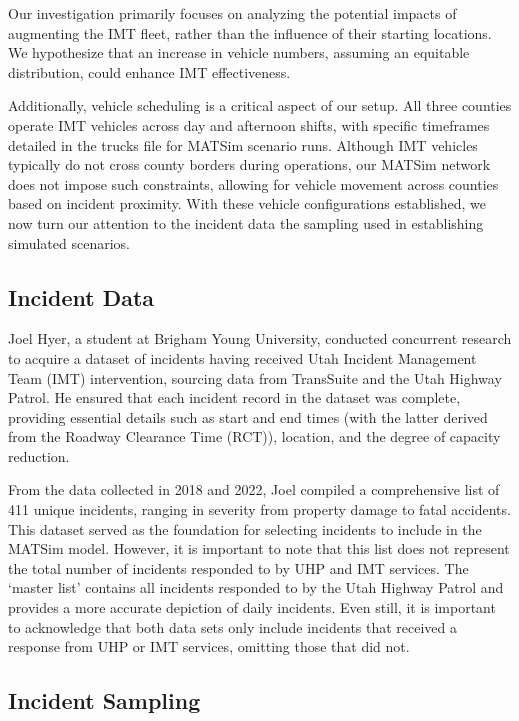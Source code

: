 \documentclass[fancy, oneside, mastersfancy, ms]{byuthesis}
\begin{document}
Our investigation primarily focuses on analyzing the potential impacts
of augmenting the IMT fleet, rather than the influence of their starting
locations. We hypothesize that an increase in vehicle numbers, assuming
an equitable distribution, could enhance IMT effectiveness.

Additionally, vehicle scheduling is a critical aspect of our setup. All
three counties operate IMT vehicles across day and afternoon shifts,
with specific timeframes detailed in the trucks file for MATSim scenario
runs. Although IMT vehicles typically do not cross county borders during
operations, our MATSim network does not impose such constraints,
allowing for vehicle movement across counties based on incident
proximity. With these vehicle configurations established, we now turn
our attention to the incident data the sampling used in establishing
simulated scenarios.

\hypertarget{incident-data}{%
\subsection{Incident Data}\label{incident-data}}

Joel Hyer, a student at Brigham Young University, conducted concurrent
research to acquire a dataset of incidents having received Utah Incident
Management Team (IMT) intervention, sourcing data from TransSuite and
the Utah Highway Patrol. He ensured that each incident record in the
dataset was complete, providing essential details such as start and end
times (with the latter derived from the Roadway Clearance Time (RCT)),
location, and the degree of capacity reduction.

From the data collected in 2018 and 2022, Joel compiled a comprehensive
list of 411 unique incidents, ranging in severity from property damage
to fatal accidents. This dataset served as the foundation for selecting
incidents to include in the MATSim model. However, it is important to
note that this list does not represent the total number of incidents
responded to by UHP and IMT services. The `master list' contains all
incidents responded to by the Utah Highway Patrol and provides a more
accurate depiction of daily incidents. Even still, it is important to
acknowledge that both data sets only include incidents that received a
response from UHP or IMT services, omitting those that did not.

\hypertarget{incident-sampling}{%
\subsection{Incident Sampling}\label{incident-sampling}}
\end{document}
